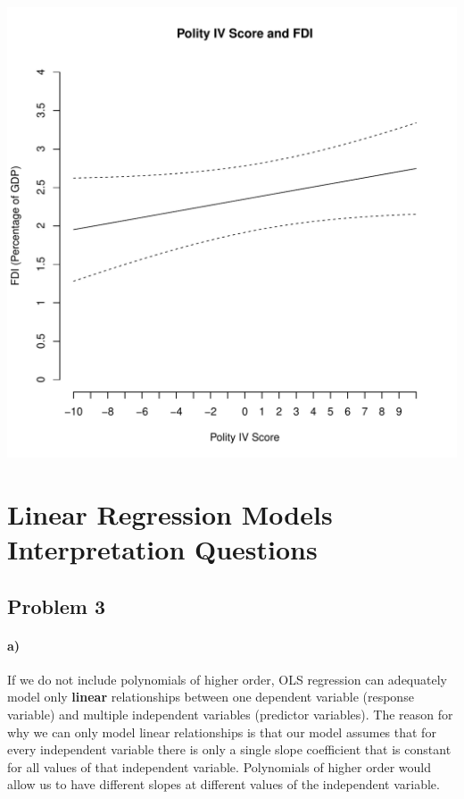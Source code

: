 \documentclass[12pt]{article}\usepackage[]{graphicx}\usepackage[]{color}
\makeatletter
\def\maxwidth{ %
  \ifdim\Gin@nat@width>\linewidth
    \linewidth
  \else
    \Gin@nat@width
  \fi
}
\newenvironment{knitrout}{}{} %
\makeatother
\begin{document}
\begin{knitrout}
\includegraphics[width=\maxwidth]{figure/unnamed-chunk-3-1} 

\end{knitrout}



\section*{Linear Regression Models Interpretation Questions}

\subsection*{Problem 3}

\paragraph*{a)} If we do not include polynomials of higher order, OLS regression can adequately model only \textbf{linear} relationships between one dependent variable (response variable) and multiple independent variables (predictor variables). The reason for why we can only model linear relationships is that our model assumes that for every independent variable there is only a single slope coefficient that is constant for all values of that independent variable. Polynomials of higher order would allow us to have different slopes at different values of the independent variable.
\end{document}
